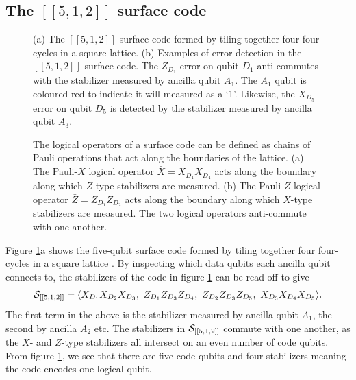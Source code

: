 \documentclass[]{arxiv}
\theoremstyle{plain}%
\theoremstyle{definition}
\theoremstyle{remark}
\begin{document}
\subsection{The $[[5,1,2]]$ surface code}


\begin{figure}
	\centering
	\subfloat[]{%
		\resizebox*{!}{!}{}}\hspace{5pt}
	\subfloat[]{%
		\resizebox*{!}{!}{}}
	

	\caption{(a) The $[[5,1,2]]$  surface code formed by tiling together four four-cycles in a square lattice. (b) Examples of error detection in the $[[5,1,2]]$ surface code. The $Z_{D_1}$ error on qubit $D_1$ anti-commutes with the stabilizer measured by ancilla qubit $A_1$. The $A_1$ qubit is coloured red to indicate it will measured as a `1'. Likewise, the $X_{D_5}$ error on qubit $D_5$ is detected by the stabilizer measured by ancilla qubit $A_3$.  }
	
	\label{fig:surface_2}
\end{figure}

\begin{figure}
	\centering
	\subfloat[]{%
		\resizebox*{!}{!}{}}\hspace{5pt}
	\subfloat[]{%
		\resizebox*{!}{!}{}}
	
	
	\caption{The logical operators of a surface code can be defined as chains of Pauli operations that act along the boundaries of the lattice. (a) The Pauli-$X$ logical operator $\bar{X}=X_{D_1}X_{D_4}$ acts along the boundary along which $Z$-type stabilizers are measured. (b) The Pauli-$Z$ logical operator $\bar{Z}=Z_{D_1}Z_{D_2}$ acts along the boundary along which $X$-type stabilizers are measured. The two logical operators anti-commute with one another.}
	
	\label{fig:surface_2_logicals}
\end{figure}




  
Figure \ref{fig:surface_2}a shows the five-qubit surface code formed by tiling together four four-cycles in a square lattice \cite{Horsman12}. By inspecting which data qubits each ancilla qubit connects to, the stabilizers of the code in figure \ref{fig:surface_2} can be read off to give
%
\begin{equation}\label{eq:512stabs}
\mathcal{S}_{\rm [[5,1,2]]} =\langle X_{D_1}X_{D_2}X_{D_3}, \ Z_{D_1}Z_{D_3}Z_{D_4}, \ Z_{D_2}Z_{D_3}Z_{D_5}, \ X_{D_3}X_{D_4}X_{D_5}\rangle \rm .
\end{equation}
%
The first term in the above is the stabilizer measured by ancilla qubit $A_1$, the second by ancilla $A_2$ etc. The stabilizers in $\mathcal{S}_{\rm [[5,1,2]]}$ commute with one another, as the $X$- and $Z$-type stabilizers all intersect on an even number of code qubits. From figure \ref{fig:surface_2}, we see that there are five code qubits and four stabilizers meaning the code encodes one logical qubit.
\end{document}
